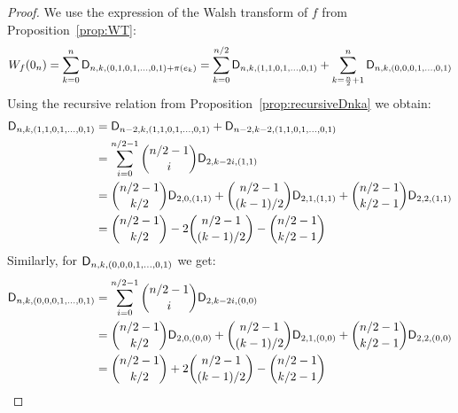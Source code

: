 \documentclass[11pt]{llncs}
\begin{document}
\begin{proof}
We use the expression of the Walsh transform of $f$ from Proposition~\ref{prop:WT}:
\[W_{f}(0_n)=\sum_{k=0}^n\mathsf{D}_{n,k,(0,1,0,1,\ldots,0,1)+\pi(e_k)}=\sum_{k=0}^{n/2}\mathsf{D}_{n,k,(1,1,0,1,\ldots,0,1)}+ \sum_{k=\frac{n}{2}+1}^{n}\mathsf{D}_{n,k,(0,0,0,1,\ldots,0,1)}\]
Using the recursive relation from Proposition~\ref{prop:recursiveDnka} we obtain:
\begin{align*}
\mathsf{D}_{n,k,(1,1,0,1,\ldots,0,1)}&= \mathsf{D}_{n-2,k,(1,1,0,1,\ldots,0,1)} + \mathsf{D}_{n-2,k-2,(1,1,0,1,\ldots,0,1)} \\
&=\sum_{i=0}^{n/2-1} \binom{n/2-1}{i} \mathsf{D}_{2,k-2i,(1,1)}\\
&=\binom{n/2-1}{k/2} \mathsf{D}_{2,0,(1,1)}+ \binom{n/2-1}{(k-1)/2} \mathsf{D}_{2,1,(1,1)}+ \binom{n/2-1}{k/2-1} \mathsf{D}_{2,2,(1,1)}\\
&=\binom{n/2-1}{k/2} -2 \binom{n/2-1}{(k-1)/2} - \binom{n/2-1}{k/2-1}\\
\end{align*}
Similarly, for $\mathsf{D}_{n,k,(0,0,0,1,\ldots,0,1)}$ we get:
\begin{align*}
\mathsf{D}_{n,k,(0,0,0,1,\ldots,0,1)}
&=\sum_{i=0}^{n/2-1} \binom{n/2-1}{i} \mathsf{D}_{2,k-2i,(0,0)}\\
&=\binom{n/2-1}{k/2} \mathsf{D}_{2,0,(0,0)}+ \binom{n/2-1}{(k-1)/2} \mathsf{D}_{2,1,(0,0)}+ \binom{n/2-1}{k/2-1} \mathsf{D}_{2,2,(0,0)}\\
&=\binom{n/2-1}{k/2} +2 \binom{n/2-1}{(k-1)/2} - \binom{n/2-1}{k/2-1}\\
\end{align*}



\end{proof}
\end{document}
